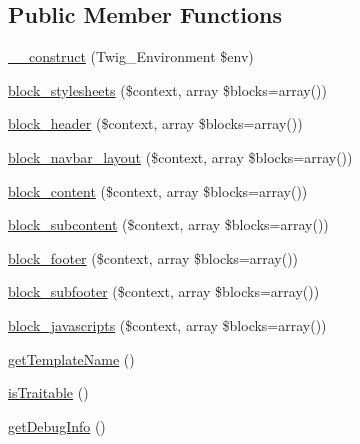 \subsection*{Public Member Functions}
\begin{DoxyCompactItemize}
\item 
\hyperlink{class_____twig_template__a869615871e490f71c262b1dd8d8d4f1_a4f8326243132c1450a81e0a817aa1be7}{\-\_\-\-\_\-construct} (Twig\-\_\-\-Environment \$env)
\item 
\hyperlink{class_____twig_template__a869615871e490f71c262b1dd8d8d4f1_affb8c4a88a94dfaf7e41f4e145764703}{block\-\_\-stylesheets} (\$context, array \$blocks=array())
\item 
\hyperlink{class_____twig_template__a869615871e490f71c262b1dd8d8d4f1_a339fc7bc2cca23febaa2851465969241}{block\-\_\-header} (\$context, array \$blocks=array())
\item 
\hyperlink{class_____twig_template__a869615871e490f71c262b1dd8d8d4f1_afd57b86101f578e9e6318f2272cab5a7}{block\-\_\-navbar\-\_\-layout} (\$context, array \$blocks=array())
\item 
\hyperlink{class_____twig_template__a869615871e490f71c262b1dd8d8d4f1_a02d2fb3aba77e5afa3a76878c7340893}{block\-\_\-content} (\$context, array \$blocks=array())
\item 
\hyperlink{class_____twig_template__a869615871e490f71c262b1dd8d8d4f1_ab4d266b7bc512d4326bda193f1f28661}{block\-\_\-subcontent} (\$context, array \$blocks=array())
\item 
\hyperlink{class_____twig_template__a869615871e490f71c262b1dd8d8d4f1_a4e99aa468a91b5ad17e3da5c288764aa}{block\-\_\-footer} (\$context, array \$blocks=array())
\item 
\hyperlink{class_____twig_template__a869615871e490f71c262b1dd8d8d4f1_ae95b98358c61cc7ae7e0aef9b56dbcfe}{block\-\_\-subfooter} (\$context, array \$blocks=array())
\item 
\hyperlink{class_____twig_template__a869615871e490f71c262b1dd8d8d4f1_aa7415aa9b3dad8473c723b3f9d93a76a}{block\-\_\-javascripts} (\$context, array \$blocks=array())
\item 
\hyperlink{class_____twig_template__a869615871e490f71c262b1dd8d8d4f1_a621a3ccd148ed8b9e937da6959c98f39}{get\-Template\-Name} ()
\item 
\hyperlink{class_____twig_template__a869615871e490f71c262b1dd8d8d4f1_aa9eb89be270f6afc256ef5e272b78a63}{is\-Traitable} ()
\item 
\hyperlink{class_____twig_template__a869615871e490f71c262b1dd8d8d4f1_abd0ecb0136f4228db2bd963bfc1e20d7}{get\-Debug\-Info} ()
\end{DoxyCompactItemize}
